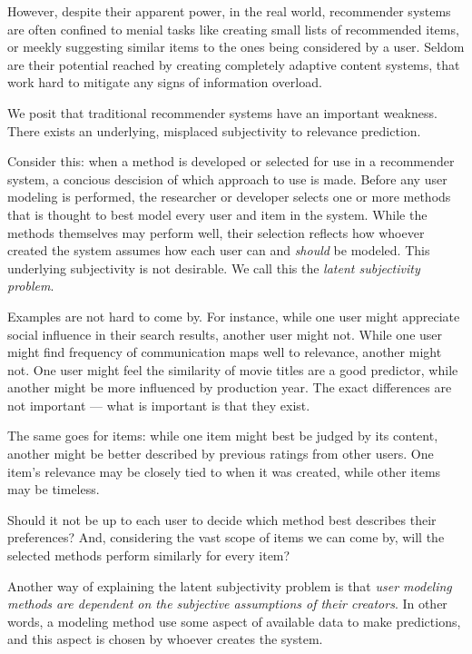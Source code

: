 However, despite their apparent power, in the real world, recommender systems are often confined
to menial tasks like creating small lists of recommended items, 
or meekly suggesting similar items to the ones being considered by a user.
Seldom are their potential reached by creating completely adaptive
content systems, that work hard to mitigate any signs of information overload.

We posit that traditional recommender systems have an important weakness.
There exists an underlying, misplaced subjectivity to relevance prediction.

Consider this: 
when a method is developed or selected for use in a recommender system,
a concious descision of which approach to use is made.
Before any user modeling is performed, the researcher or developer selects
one or more methods that is thought to best model every user and item in the system.
While the methods themselves may perform well, their selection
reflects how whoever created the system assumes how each user
can and \emph{should} be modeled. This underlying subjectivity is not desirable.
We call this the \emph{latent subjectivity problem}.

Examples are not hard to come by.
For instance, while one user might appreciate social
influence in their search results, another user might not.
While one user might find frequency of communication maps well to relevance,
another might not. 
One user might feel the similarity of movie titles are a good predictor,
while another might be more influenced by production year.
The exact differences are not important --- what is important is that they exist.

The same goes for items: while one item might best be judged by its content,
another might be better described by previous ratings from other users.
One item's relevance may be closely tied to when it was created,
while other items may be timeless.

Should it not be up to each user to decide which method best describes their preferences?
And, considering the vast scope of items we can come by, will the selected
methods perform similarly for every item?

Another way of explaining the latent subjectivity problem is that 
\emph{user modeling methods are dependent on the subjective assumptions of their creators}.
In other words, a modeling method use some aspect of available data to make predictions,
and this aspect is chosen by whoever creates the system.

